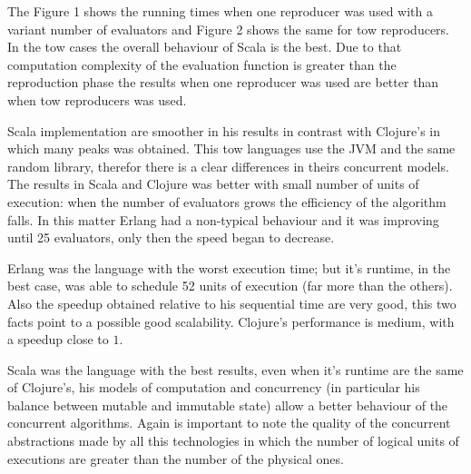 The Figure 1 shows the running times when one reproducer was used with a variant number of evaluators and Figure 2 shows the same for tow reproducers. In the tow cases the overall behaviour of Scala is the best. Due to that computation complexity of the evaluation function is greater than the reproduction phase the results when one reproducer was used are better than when tow reproducers was used.

Scala implementation are smoother in his results in contrast with Clojure's in which many peaks was obtained. This tow languages use the JVM and the same random library, therefor there is a clear differences in theirs concurrent models. The results in Scala and Clojure was better with small number of units of execution: when the number of evaluators grows the efficiency of the algorithm falls. In this matter Erlang had a non-typical behaviour and it was improving until 25 evaluators, only then the speed began to decrease.

Erlang was the language with the worst execution time; but it's runtime, in the best case, was able to schedule 52 units of execution (far more than the others). Also the speedup obtained relative to his sequential time are very good, this two facts point to a possible good scalability. Clojure's performance is medium, with a speedup close to $1$.

Scala was the language with the best results, even when it's runtime are the same of Clojure's, his models of computation and concurrency (in particular his balance between mutable and immutable state) allow a better behaviour of the concurrent algorithms. Again is important to note the quality of the concurrent abstractions made by all this technologies in which the number of logical units of executions are greater than the number of the physical ones.
